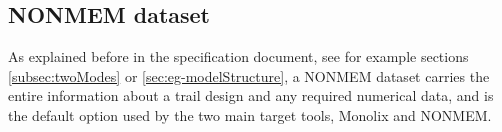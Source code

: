 



\subsection{NONMEM dataset}
\label{sec:eg1-NONMEMdataset}

As explained before in the specification document, see for example sections 
\ref{subsec:twoModes} or \ref{sec:eg-modelStructure}, a NONMEM dataset 
carries the entire information about a trail design and any required numerical 
data, and is the default option used by the two main target tools, Monolix and 
NONMEM.

